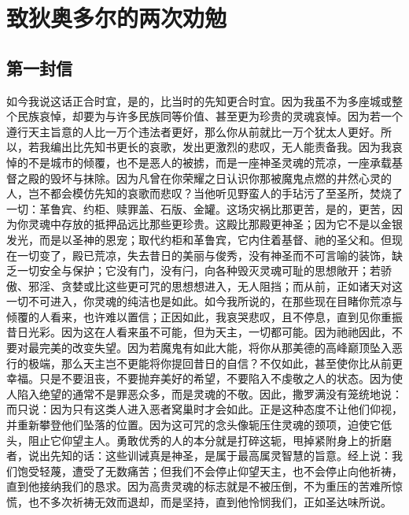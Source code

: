 
\chapter{致狄奥多尔的两次劝勉}



\section{第一封信}

 如今我说这话正合时宜，是的，比当时的先知更合时宜。因为我虽不为多座城或整个民族哀悼，却要为与许多民族同等价值、甚至更为珍贵的灵魂哀悼。因为若一个遵行天主旨意的人比一万个违法者更好，那么你从前就比一万个犹太人更好。所以，若我编出比先知书更长的哀歌，发出更激烈的悲叹，无人能责备我。因为我哀悼的不是城市的倾覆，也不是恶人的被掳，而是一座神圣灵魂的荒凉，一座承载基督之殿的毁坏与抹除。因为凡曾在你荣耀之日认识你那被魔鬼点燃的井然心灵的人，岂不都会模仿先知的哀歌而悲叹？当他听见野蛮人的手玷污了至圣所，焚烧了一切：革鲁宾、约柜、赎罪盖、石版、金罐。这场灾祸比那更苦，是的，更苦，因为你灵魂中存放的抵押品远比那些更珍贵。这殿比那殿更神圣；因为它不是以金银发光，而是以圣神的恩宠；取代约柜和革鲁宾，它内住着基督、祂的圣父和。但现在一切变了，殿已荒凉，失去昔日的美丽与俊秀，没有神圣而不可言喻的装饰，缺乏一切安全与保护；它没有门，没有闩，向各种毁灭灵魂可耻的思想敞开；若骄傲、邪淫、贪婪或比这些更可咒的思想想进入，无人阻挡；而从前，正如诸天对这一切不可进入，你灵魂的纯洁也是如此。如今我所说的，在那些现在目睹你荒凉与倾覆的人看来，也许难以置信；正因如此，我哀哭悲叹，且不停息，直到见你重振昔日光彩。因为这在人看来虽不可能，但为天主，一切都可能。因为祂祂因此，不要对最完美的改变失望。因为若魔鬼有如此大能，将你从那美德的高峰巅顶坠入恶行的极端，那么天主岂不更能将你提回昔日的自信？不仅如此，甚至使你比从前更幸福。只是不要沮丧，不要抛弃美好的希望，不要陷入不虔敬之人的状态。因为使人陷入绝望的通常不是罪恶众多，而是灵魂的不敬。因此，撒罗满没有笼统地说：而只说：因为只有这类人进入恶者窝巢时才会如此。正是这种态度不让他们仰视，并重新攀登他们坠落的位置。因为这可咒的念头像轭压住灵魂的颈项，迫使它低头，阻止它仰望主人。勇敢优秀的人的本分就是打碎这轭，甩掉紧附身上的折磨者，说出先知的话：这些训诫真是神圣，是属于最高属灵智慧的旨意。经上说：我们饱受轻蔑，遭受了无数痛苦；但我们不会停止仰望天主，也不会停止向他祈祷，直到他接纳我们的恳求。因为高贵灵魂的标志就是不被压倒，不为重压的苦难所惊慌，也不多次祈祷无效而退却，而是坚持，直到他怜悯我们，正如圣达味所说。\par

